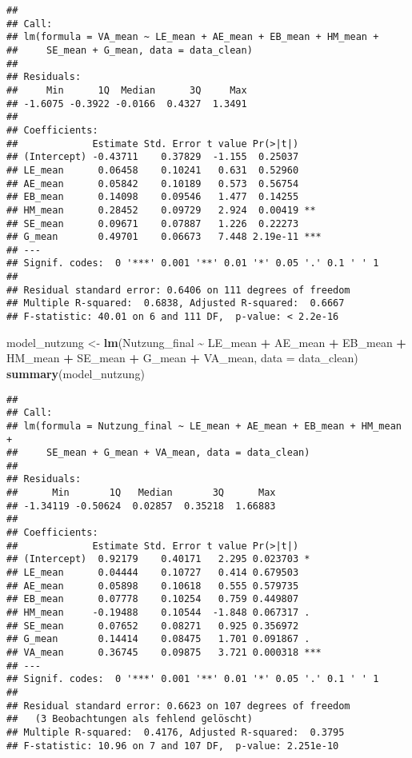 \documentclass[
]{article}
\newenvironment{Shaded}{\begin{snugshade}}{\end{snugshade}}
\newcommand{\AttributeTok}[1]{\textcolor[rgb]{0.13,0.29,0.53}{#1}}
\newcommand{\FunctionTok}[1]{\textcolor[rgb]{0.13,0.29,0.53}{\textbf{#1}}}
\newcommand{\NormalTok}[1]{#1}
\newcommand{\OtherTok}[1]{\textcolor[rgb]{0.56,0.35,0.01}{#1}}
\newcommand{\SpecialCharTok}[1]{\textcolor[rgb]{0.81,0.36,0.00}{\textbf{#1}}}
\begin{document}
\begin{verbatim}
## 
## Call:
## lm(formula = VA_mean ~ LE_mean + AE_mean + EB_mean + HM_mean + 
##     SE_mean + G_mean, data = data_clean)
## 
## Residuals:
##     Min      1Q  Median      3Q     Max 
## -1.6075 -0.3922 -0.0166  0.4327  1.3491 
## 
## Coefficients:
##             Estimate Std. Error t value Pr(>|t|)    
## (Intercept) -0.43711    0.37829  -1.155  0.25037    
## LE_mean      0.06458    0.10241   0.631  0.52960    
## AE_mean      0.05842    0.10189   0.573  0.56754    
## EB_mean      0.14098    0.09546   1.477  0.14255    
## HM_mean      0.28452    0.09729   2.924  0.00419 ** 
## SE_mean      0.09671    0.07887   1.226  0.22273    
## G_mean       0.49701    0.06673   7.448 2.19e-11 ***
## ---
## Signif. codes:  0 '***' 0.001 '**' 0.01 '*' 0.05 '.' 0.1 ' ' 1
## 
## Residual standard error: 0.6406 on 111 degrees of freedom
## Multiple R-squared:  0.6838, Adjusted R-squared:  0.6667 
## F-statistic: 40.01 on 6 and 111 DF,  p-value: < 2.2e-16
\end{verbatim}

\begin{Shaded}
\begin{Highlighting}[]
\NormalTok{model\_nutzung }\OtherTok{\textless{}{-}} \FunctionTok{lm}\NormalTok{(Nutzung\_final }\SpecialCharTok{\textasciitilde{}}\NormalTok{ LE\_mean }\SpecialCharTok{+}\NormalTok{ AE\_mean }\SpecialCharTok{+}\NormalTok{ EB\_mean }\SpecialCharTok{+}\NormalTok{ HM\_mean }\SpecialCharTok{+}\NormalTok{ SE\_mean }\SpecialCharTok{+}\NormalTok{ G\_mean }\SpecialCharTok{+}\NormalTok{ VA\_mean, }\AttributeTok{data =}\NormalTok{ data\_clean)}
\FunctionTok{summary}\NormalTok{(model\_nutzung)}
\end{Highlighting}
\end{Shaded}

\begin{verbatim}
## 
## Call:
## lm(formula = Nutzung_final ~ LE_mean + AE_mean + EB_mean + HM_mean + 
##     SE_mean + G_mean + VA_mean, data = data_clean)
## 
## Residuals:
##      Min       1Q   Median       3Q      Max 
## -1.34119 -0.50624  0.02857  0.35218  1.66883 
## 
## Coefficients:
##             Estimate Std. Error t value Pr(>|t|)    
## (Intercept)  0.92179    0.40171   2.295 0.023703 *  
## LE_mean      0.04444    0.10727   0.414 0.679503    
## AE_mean      0.05898    0.10618   0.555 0.579735    
## EB_mean      0.07778    0.10254   0.759 0.449807    
## HM_mean     -0.19488    0.10544  -1.848 0.067317 .  
## SE_mean      0.07652    0.08271   0.925 0.356972    
## G_mean       0.14414    0.08475   1.701 0.091867 .  
## VA_mean      0.36745    0.09875   3.721 0.000318 ***
## ---
## Signif. codes:  0 '***' 0.001 '**' 0.01 '*' 0.05 '.' 0.1 ' ' 1
## 
## Residual standard error: 0.6623 on 107 degrees of freedom
##   (3 Beobachtungen als fehlend gelöscht)
## Multiple R-squared:  0.4176, Adjusted R-squared:  0.3795 
## F-statistic: 10.96 on 7 and 107 DF,  p-value: 2.251e-10
\end{verbatim}
\end{document}
